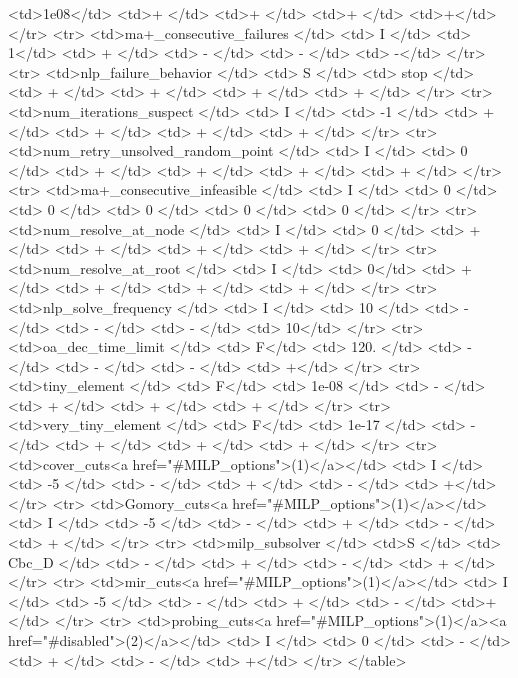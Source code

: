 {\begin{rawhtml}
    <td>1e08</td>
    <td>+ </td>
    <td>+ </td>
    <td>+ </td>
    <td>+</td>
  </tr>
  <tr>
    <td>ma+_consecutive_failures </td>
    <td> I </td>
    <td> 1</td>
    <td> + </td>
    <td> - </td>
    <td> - </td>
    <td> -</td>
  </tr>
  <tr>
    <td>nlp_failure_behavior </td>
    <td> S </td>
    <td> stop </td>
    <td> + </td>
    <td> + </td>
    <td> + </td>
    <td> + </td>
  </tr>
  <tr>
    <td>num_iterations_suspect </td>
    <td> I </td>
    <td> -1 </td>
    <td> + </td>
    <td> + </td>
    <td> + </td>
    <td> + </td>
  </tr>
  <tr>
    <td>num_retry_unsolved_random_point </td>
    <td> I </td>
    <td> 0 </td>
    <td> + </td>
    <td> + </td>
    <td> + </td>
    <td> + </td>
  </tr>
  <tr>
    <td>ma+_consecutive_infeasible </td>
    <td> I </td>
    <td> 0 </td>
    <td> 0 </td>
    <td> 0 </td>
    <td> 0 </td>
    <td> 0 </td>
  </tr>
  <tr>
    <td>num_resolve_at_node </td>
    <td> I </td>
    <td> 0 </td>
    <td> + </td>
    <td> + </td>
    <td> + </td>
    <td> + </td>
  </tr>
  <tr>
    <td>num_resolve_at_root </td>
    <td> I </td>
    <td> 0</td>
    <td> + </td>
    <td> + </td>
    <td> + </td>
    <td> + </td>
  </tr>
  <tr>
    <td>nlp_solve_frequency </td>
    <td> I </td>
    <td> 10 </td>
    <td> - </td>
    <td> - </td>
    <td> - </td>
    <td> 10</td>
  </tr>
  <tr>
    <td>oa_dec_time_limit </td>
    <td> F</td>
    <td> 120. </td>
    <td> - </td>
    <td> - </td>
    <td> - </td>
    <td> +</td>
  </tr>
  <tr>
    <td>tiny_element </td>
    <td> F</td>
    <td> 1e-08 </td>
    <td> - </td>
    <td> + </td>
    <td> + </td>
    <td> + </td>
  </tr>
  <tr>
    <td>very_tiny_element </td>
    <td> F</td>
    <td> 1e-17 </td>
    <td> - </td>
    <td> + </td>
    <td> + </td>
    <td> + </td>
  </tr>
    <tr>
    <td>cover_cuts<a href="#MILP_options">(1)</a></td>
    <td> I </td>
    <td> -5 </td>
    <td> - </td>
    <td> + </td>
    <td> - </td>
    <td> +</td>
  </tr>
  <tr>
    <td>Gomory_cuts<a href="#MILP_options">(1)</a></td>
    <td> I </td>
    <td> -5 </td>
    <td> - </td>
    <td> + </td>
    <td> - </td>
    <td> + </td>
  </tr>
  <tr>
    <td>milp_subsolver </td>
    <td>S </td>
    <td> Cbc_D </td>
    <td> - </td>
    <td> + </td>
    <td> - </td>
    <td> + </td>
  </tr>
  <tr>
    <td>mir_cuts<a href="#MILP_options">(1)</a></td>
    <td> I </td>
    <td> -5 </td>
    <td> - </td>
    <td> + </td>
    <td> - </td>
    <td>+</td>
  </tr>
  <tr>
    <td>probing_cuts<a href="#MILP_options">(1)</a><a href="#disabled">(2)</a></td>
    <td> I </td>
    <td> 0 </td>
    <td> - </td>
    <td> + </td>
    <td> - </td>
    <td> +</td>
  </tr>
</table>
\end{rawhtml}
}



